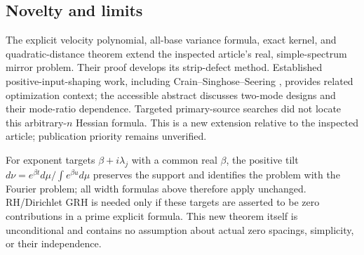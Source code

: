 \subsection{Novelty and limits}
The explicit velocity polynomial, all-base variance formula, exact kernel,
and quadratic-distance theorem extend the inspected article's real,
simple-spectrum mirror problem. Their proof develops its strip-defect
method. Established positive-input-shaping work, including
Crain--Singhose--Seering \cite{Crain1996}, provides related optimization
context; the accessible abstract discusses two-mode designs and their
mode-ratio dependence. Targeted primary-source searches did not locate
this arbitrary-$n$ Hessian formula. This is a new extension relative to
the inspected article; publication priority remains unverified.

For exponent targets $\beta+i\lambda_j$ with a common real $\beta$, the
positive tilt $d\nu=e^{\beta t}d\mu/\int e^{\beta u}d\mu$ preserves the
support and identifies the problem with the Fourier problem; all width
formulas above therefore apply unchanged. RH/Dirichlet GRH is needed only
if these targets are asserted to be zero contributions in a prime explicit
formula. This new theorem itself is unconditional and contains no
assumption about actual zero spacings, simplicity, or their independence.
